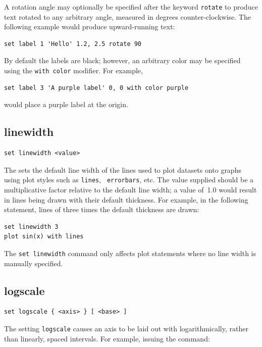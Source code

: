 A rotation angle may optionally be specified after the keyword {\tt rotate}
to produce text rotated to any arbitrary angle, measured in degrees
counter-clockwise. The following example would produce upward-running text:

\begin{verbatim}
set label 1 'Hello' 1.2, 2.5 rotate 90
\end{verbatim}

By default the labels are black; however, an arbitrary color may be specified
using the {\tt with color} modifier.  For example,

\begin{verbatim}
set label 3 'A purple label' 0, 0 with color purple
\end{verbatim}

\noindent would place a purple label at the origin.


\subsection{linewidth}

\begin{verbatim}
set linewidth <value>
\end{verbatim}

The  sets the default line width of the lines used to
plot datasets onto graphs using plot styles such as {\tt lines}, {\tt
errorbars}, etc. The value supplied should be a multiplicative factor relative
to the default line width; a value of~1.0 would result in lines being drawn
with their default thickness. For example, in the following statement, lines of
three times the default thickness are drawn:

\begin{verbatim}
set linewidth 3
plot sin(x) with lines
\end{verbatim}

\noindent The {\tt set linewidth} command only affects plot statements where no
line width is manually specified.


\subsection{logscale}

\begin{verbatim}
set logscale { <axis> } [ <base> ]
\end{verbatim}

The setting {\tt logscale} causes an axis to be laid out with logarithmically,
rather than linearly, spaced intervals.  For example, issuing the command:

